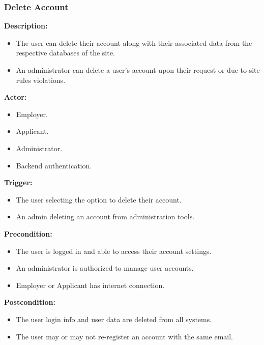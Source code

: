 \documentclass[a4paper]{article}
\begin{document}
        \subsubsection{Delete Account}
        \textbf{Description:}
        \begin{itemize}
            \item The user can delete their account along with their associated data from the respective databases of the site.
            \item An administrator can delete a user's account upon their request or due to site rules violations.
        \end{itemize}

        \textbf{Actor:}
        \begin{itemize}
            \item Employer.
            \item Applicant.
            \item Administrator.
            \item Backend authentication.
        \end{itemize}
        
        \textbf{Trigger:}
        \begin{itemize}
            \item The user selecting the option to delete their account.
            \item An admin deleting an account from administration tools.
        \end{itemize}

        \textbf{Precondition:}
        \begin{itemize}
            \item The user is logged in and able to access their account settings.
            \item An administrator is authorized to manage user accounts.
            \item Employer or Applicant has internet connection.
        \end{itemize}

        \textbf{Postcondition:}
        \begin{itemize}
            \item The user login info and user data are deleted from all systems.
            \item The user may or may not re-register an account with the same email.
        \end{itemize}
\end{document}
